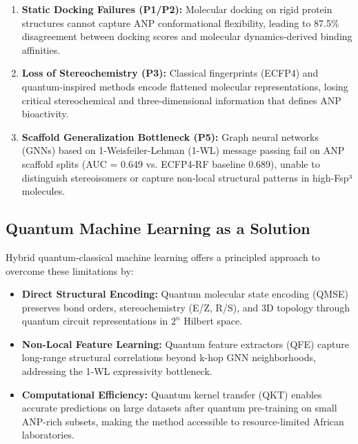 \documentclass[11pt,a4paper]{article}
\begin{document}
\begin{enumerate}[leftmargin=1.5em]
    \item \textbf{Static Docking Failures (P1/P2):} Molecular docking on rigid protein structures cannot capture ANP conformational flexibility, leading to 87.5\% disagreement between docking scores and molecular dynamics-derived binding affinities.
    
    \item \textbf{Loss of Stereochemistry (P3):} Classical fingerprints (ECFP4) and quantum-inspired methods encode flattened molecular representations, losing critical stereochemical and three-dimensional information that defines ANP bioactivity.
    
    \item \textbf{Scaffold Generalization Bottleneck (P5):} Graph neural networks (GNNs) based on 1-Weisfeiler-Lehman (1-WL) message passing fail on ANP scaffold splits (AUC = 0.649 vs. ECFP4-RF baseline 0.689), unable to distinguish stereoisomers or capture non-local structural patterns in high-Fsp³ molecules.
\end{enumerate}

\subsection{Quantum Machine Learning as a Solution}

Hybrid quantum-classical machine learning offers a principled approach to overcome these limitations by:

\begin{itemize}[leftmargin=1.5em]
    \item \textbf{Direct Structural Encoding:} Quantum molecular state encoding (QMSE) preserves bond orders, stereochemistry (E/Z, R/S), and 3D topology through quantum circuit representations in $2^n$ Hilbert space.
    
    \item \textbf{Non-Local Feature Learning:} Quantum feature extractors (QFE) capture long-range structural correlations beyond k-hop GNN neighborhoods, addressing the 1-WL expressivity bottleneck.
    
    \item \textbf{Computational Efficiency:} Quantum kernel transfer (QKT) enables accurate predictions on large datasets after quantum pre-training on small ANP-rich subsets, making the method accessible to resource-limited African laboratories.
\end{itemize}
\end{document}
